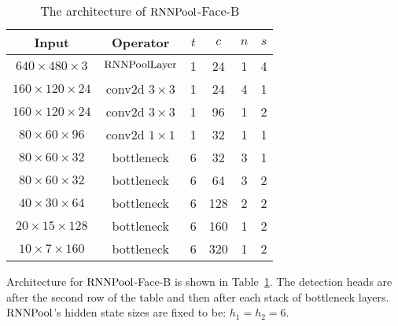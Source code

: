 \documentclass[10pt]{article}
\newcommand{\rpool}{\ensuremath{{\rm RNNPool}}\xspace}
\newcommand{\rpoollayer}{\ensuremath{{\rm RNNPoolLayer}}\xspace}
\begin{document}
\begin{table}[ht]
\centering
    \caption{\small The architecture of \rpool-Face-B}
\begin{tabular}{ c | c | c | c | c | c }
      \toprule
	  {Input} & {Operator} & $t$ & $c$ & $n$ & $s$\\
	  \midrule
	  $640 \times 480 \times 3$ & \rpoollayer & 1 & 24 & 1 & 4\\
	  $160 \times 120 \times 24$ & conv2d $3\times3$ & 1 & 24 & 4 & 1\\
	  $160 \times 120 \times 24$ & conv2d $3\times3$ & 1 & 96 & 1 & 2\\
	  $80 \times 60 \times 96$ & conv2d $1\times1$ & 1 & 32 & 1 & 1\\
	  $80 \times 60 \times 32$ & bottleneck & 6 & 32 & 3 & 1\\
	  $80 \times 60 \times 32$ & bottleneck & 6 & 64 & 3 & 2\\
	  $40 \times 30 \times 64$ & bottleneck & 6 & 128 & 2 & 2\\
	  $20 \times 15 \times 128$ & bottleneck & 6 & 160 & 1 & 2\\
	  $10 \times 7 \times 160$ & bottleneck & 6 & 320 & 1 & 2\\
	  \bottomrule
  \end{tabular}
  \label{tab:rpool-face-b}
  \end{table} 
Architecture for \rpool-Face-B is shown in Table~\ref{tab:rpool-face-b}. The detection heads are after the second row of the table and then after each stack of bottleneck layers. \rpool's hidden state sizes are fixed to be: $h_1=h_2=6$.
\end{document}

